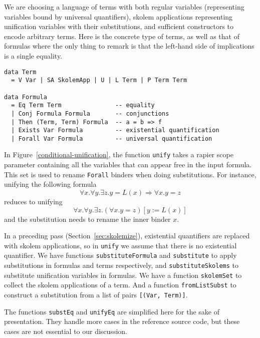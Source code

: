 \documentclass[sigconf]{acmart}
\newcommand{\tc}[1]{{\small\texttt{#1}}}
\begin{document}
We are choosing a language of terms with both regular variables (representing
variables bound by universal quantifiers), skolem applications representing
unification variables with their substitutions, and sufficient
constructors to encode arbitrary terms. Here is the concrete type of terms, as
well as that of formulas where the only thing to remark is that the left-hand
side of implications is a single equality.

\begin{verbatim}
data Term
  = V Var | SA SkolemApp | U | L Term | P Term Term

data Formula
  = Eq Term Term               -- equality
  | Conj Formula Formula       -- conjunctions
  | Then (Term, Term) Formula  -- a = b => f
  | Exists Var Formula         -- existential quantification
  | Forall Var Formula         -- universal quantification
\end{verbatim}

In Figure~\ref{conditional-unification}, the function \tc{unify} takes a rapier scope parameter containing all the variables that
can appear free in the input formula. This set is used to rename \tc{Forall}
binders when doing substitutions. For instance, unifying the following formula
$$\forall x. \forall y. \exists z. y = L(x) \Rightarrow \forall x. y = z$$
reduces to unifying
$$\forall x. \forall y. \exists z. (\forall x. y = z)[y:=L(x)]$$
and the substitution needs to rename the inner binder $x$.

In a preceding pass (Section~\ref{sec:skolemize}), existential quantifiers are replaced
with skolem applications, so in \tc{unify} we assume that there is no
existential quantifier. We have functions \tc{substituteFormula} and \tc{substitute}
to apply substitutions in formulas and terms respectively, and \tc{substituteSkolems} to  substitute
unification variables in formulas. We have a function \tc{skolemSet} to collect the skolem applications of a
term. And a function \tc{fromListSubst} to construct a substitution from a list of
pairs \tc{[(Var, Term)]}.

The functions \tc{substEq} and \tc{unifyEq} are simplified here for the sake of presentation.
They handle more cases in the reference source code, but these cases are not essential to our
discussion.
\end{document}
